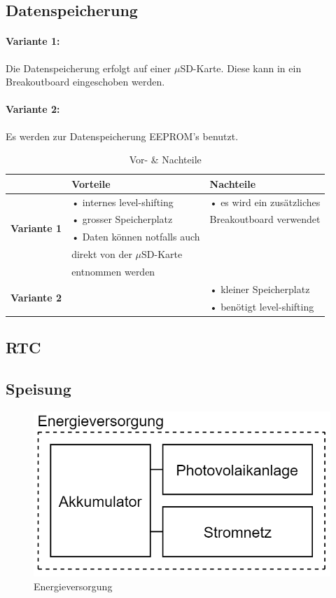 \subsection{Datenspeicherung}
\paragraph{Variante 1:}

Die Datenspeicherung erfolgt auf einer $\mu$SD-Karte. Diese kann in ein Breakoutboard eingeschoben werden.\\

\paragraph{Variante 2:}

Es werden zur Datenspeicherung EEPROM's benutzt.\\

\begin{table}[h]
  \centering
  \label{tab:datenspeicherung}
  \small
  \caption{Vor- \& Nachteile}
    \begin{tabular}{c|l|l}
          & \textbf{Vorteile} & \textbf{Nachteile} \\
    \toprule
    \multirow{4}[2]{*}{\textbf{Variante 1}} & • internes level-shifting & • es wird ein zusätzliches \\
          & • grosser Speicherplatz & \hspace{0.3cm}Breakoutboard verwendet \\
          & • Daten können notfalls auch &  \\
          &   \hspace{0.3cm} direkt von der $\mu$SD-Karte &  \\
          &   \hspace{0.3cm} entnommen werden &  \\
    \hline
    \multirow{2}[1]{*}{\textbf{Variante 2}} &       & • kleiner Speicherplatz \\
          &       & • benötigt level-shifting \\
    \end{tabular}%
  \label{tab:addlabel}%
\end{table}%


\subsection{RTC}

\subsection{Speisung}
\begin{figure}[h]
\centering
\includegraphics[scale=0.6]{graphics/Energieversorgung.PNG}
\caption{Energieversorgung}
\end{figure}
